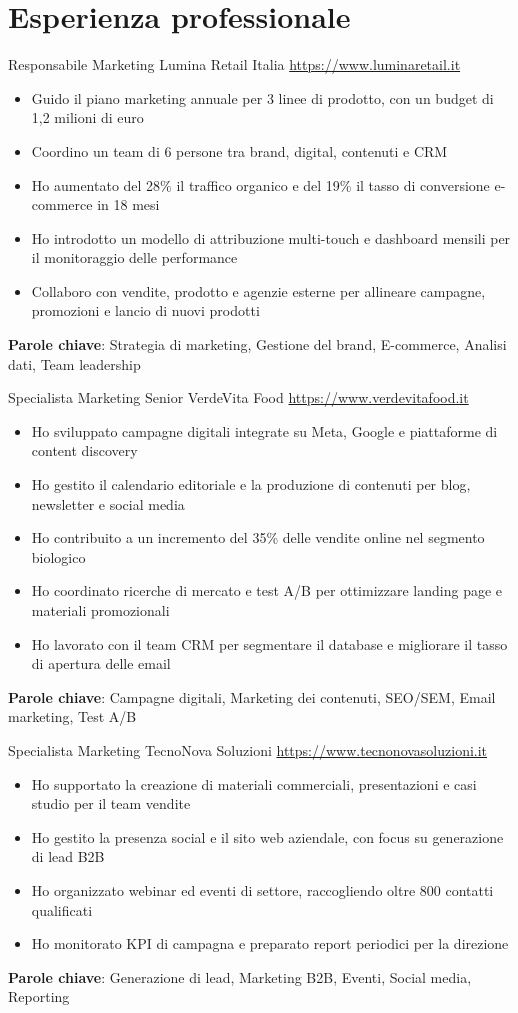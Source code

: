 \documentclass[a4paper, serif, 10pt]{moderncv}
\begin{document}
\section{Esperienza professionale}

        {Responsabile Marketing}
        {Lumina Retail Italia}
        {\url{https://www.luminaretail.it}}
        {}
        {\begin{itemize}
\item Guido il piano marketing annuale per 3 linee di prodotto, con un budget di 1,2 milioni di euro
\item Coordino un team di 6 persone tra brand, digital, contenuti e CRM
\item Ho aumentato del 28\% il traffico organico e del 19\% il tasso di conversione e-commerce in 18 mesi
\item Ho introdotto un modello di attribuzione multi-touch e dashboard mensili per il monitoraggio delle performance
\item Collaboro con vendite, prodotto e agenzie esterne per allineare campagne, promozioni e lancio di nuovi prodotti
\end{itemize}
\textbf{Parole chiave}: Strategia di marketing, Gestione del brand, E-commerce, Analisi dati, Team leadership}

        {Specialista Marketing Senior}
        {VerdeVita Food}
        {\url{https://www.verdevitafood.it}}
        {}
        {\begin{itemize}
\item Ho sviluppato campagne digitali integrate su Meta, Google e piattaforme di content discovery
\item Ho gestito il calendario editoriale e la produzione di contenuti per blog, newsletter e social media
\item Ho contribuito a un incremento del 35\% delle vendite online nel segmento biologico
\item Ho coordinato ricerche di mercato e test A/B per ottimizzare landing page e materiali promozionali
\item Ho lavorato con il team CRM per segmentare il database e migliorare il tasso di apertura delle email
\end{itemize}
\textbf{Parole chiave}: Campagne digitali, Marketing dei contenuti, SEO/SEM, Email marketing, Test A/B}

        {Specialista Marketing}
        {TecnoNova Soluzioni}
        {\url{https://www.tecnonovasoluzioni.it}}
        {}
        {\begin{itemize}
\item Ho supportato la creazione di materiali commerciali, presentazioni e casi studio per il team vendite
\item Ho gestito la presenza social e il sito web aziendale, con focus su generazione di lead B2B
\item Ho organizzato webinar ed eventi di settore, raccogliendo oltre 800 contatti qualificati
\item Ho monitorato KPI di campagna e preparato report periodici per la direzione
\end{itemize}
\textbf{Parole chiave}: Generazione di lead, Marketing B2B, Eventi, Social media, Reporting}
\end{document}

